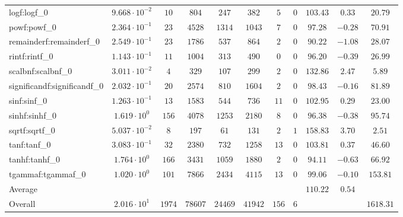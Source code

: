 \begin{tabular}{|l|c|c|c|c|c|c|c|c|c|c|}
logf:logf\_0                 & $ 9.668 \cdot 10^{-2} $ & $ 10     $ & $ 804   $ & $ 247   $ & $ 382   $ & $ 5   $ & $ 0 $ & $ 103.43      $ & $ 0.33    $ & $ 20.79   $ \\
powf:powf\_0                 & $ 2.364 \cdot 10^{-1} $ & $ 23     $ & $ 4528  $ & $ 1314  $ & $ 1043  $ & $ 7   $ & $ 0 $ & $ 97.28       $ & $ -0.28   $ & $ 70.91   $ \\
remainderf:remainderf\_0     & $ 2.549 \cdot 10^{-1} $ & $ 23     $ & $ 1786  $ & $ 537   $ & $ 864   $ & $ 2   $ & $ 0 $ & $ 90.22       $ & $ -1.08   $ & $ 28.07   $ \\
rintf:rintf\_0               & $ 1.143 \cdot 10^{-1} $ & $ 11     $ & $ 1004  $ & $ 313   $ & $ 490   $ & $ 0   $ & $ 0 $ & $ 96.20       $ & $ -0.39   $ & $ 26.99   $ \\
scalbnf:scalbnf\_0           & $ 3.011 \cdot 10^{-2} $ & $ 4      $ & $ 329   $ & $ 107   $ & $ 299   $ & $ 2   $ & $ 0 $ & $ 132.86      $ & $ 2.47    $ & $ 5.89    $ \\
significandf:significandf\_0 & $ 2.032 \cdot 10^{-1} $ & $ 20     $ & $ 2574  $ & $ 810   $ & $ 1604  $ & $ 2   $ & $ 0 $ & $ 98.43       $ & $ -0.16   $ & $ 81.89   $ \\
sinf:sinf\_0                 & $ 1.263 \cdot 10^{-1} $ & $ 13     $ & $ 1583  $ & $ 544   $ & $ 736   $ & $ 11  $ & $ 0 $ & $ 102.95      $ & $ 0.29    $ & $ 23.00   $ \\
sinhf:sinhf\_0               & $ 1.619 \cdot 10^{0}  $ & $ 156    $ & $ 4078  $ & $ 1253  $ & $ 2180  $ & $ 8   $ & $ 0 $ & $ 96.38       $ & $ -0.38   $ & $ 95.74   $ \\
sqrtf:sqrtf\_0               & $ 5.037 \cdot 10^{-2} $ & $ 8      $ & $ 197   $ & $ 61    $ & $ 131   $ & $ 2   $ & $ 1 $ & $ 158.83      $ & $ 3.70    $ & $ 2.51    $ \\
tanf:tanf\_0                 & $ 3.083 \cdot 10^{-1} $ & $ 32     $ & $ 2380  $ & $ 732   $ & $ 1258  $ & $ 13  $ & $ 0 $ & $ 103.81      $ & $ 0.37    $ & $ 46.60   $ \\
tanhf:tanhf\_0               & $ 1.764 \cdot 10^{0}  $ & $ 166    $ & $ 3431  $ & $ 1059  $ & $ 1880  $ & $ 2   $ & $ 0 $ & $ 94.11       $ & $ -0.63   $ & $ 66.92   $ \\
tgammaf:tgammaf\_0           & $ 1.020 \cdot 10^{0}  $ & $ 101    $ & $ 7866  $ & $ 2434  $ & $ 4115  $ & $ 13  $ & $ 0 $ & $ 99.06       $ & $ -0.10   $ & $ 153.81  $ \\
\hline
Average                      & $                     $ & $        $ & $       $ & $       $ & $       $ & $     $ & $   $ & $ 110.22      $ & $ 0.54    $ & $         $ \\
\hline
Overall                      & $ 2.016 \cdot 10^{1}  $ & $ 1974   $ & $ 78607 $ & $ 24469 $ & $ 41942 $ & $ 156 $ & $ 6 $ & $             $ & $         $ & $ 1618.31 $ \\
\hline
\end{tabular}
